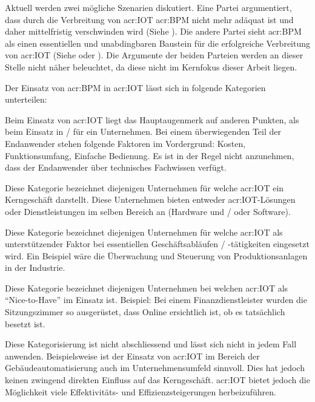 Aktuell werden zwei mögliche Szenarien diskutiert. Eine Partei argumentiert, dass durch die Verbreitung von \gls{acr:IOT} \gls{acr:BPM} nicht mehr adäquat ist und daher mittelfristig verschwinden wird (Siehe \cite{E:LinkedIn:Herring:IOTBPM}). Die andere Partei sieht \gls{acr:BPM} als einen essentiellen und unabdingbaren Baustein für die erfolgreiche Verbreitung von \gls{acr:IOT} (Siehe \cite{E:DataInformed:IOTBPM} oder \cite{E:InformationAge:IOTBPM}). Die Argumente der beiden Parteien werden an dieser Stelle nicht näher beleuchtet, da diese nicht im Kernfokus dieser Arbeit liegen.


Der Einsatz von \gls{acr:BPM} in \gls{acr:IOT} lässt sich in folgende Kategorien unterteilen:
\begin{itemize}
{Beim Einsatz von \gls{acr:IOT} liegt das Hauptaugenmerk auf anderen Punkten, als beim Einsatz in / für ein Unternehmen. Bei einem überwiegenden Teil der Endanwender stehen folgende Faktoren im Vordergrund: Kosten, Funktionsumfang, Einfache Bedienung. Es ist in der Regel nicht anzunehmen, dass der Endanwender über technisches Fachwissen verfügt.}

{Diese Kategorie bezeichnet diejenigen Unternehmen für welche \gls{acr:IOT} ein Kerngeschäft darstellt. Diese Unternehmen bieten entweder \gls{acr:IOT}-Lösungen oder Dienstleistungen im selben Bereich an (Hardware und / oder Software).}
 
{Diese Kategorie bezeichnet diejenigen Unternehmen für welche \gls{acr:IOT} als unterstützender Faktor bei essentiellen Geschäftsabläufen / -tätigkeiten eingesetzt wird. Ein Beispiel wäre die Überwachung und Steuerung von Produktionsanlagen in der Industrie.}

{Diese Kategorie bezeichnet diejenigen Unternehmen bei welchen \gls{acr:IOT} als "`Nice-to-Have"' im Einsatz ist. Beispiel: Bei einem Finanzdienstleister wurden die Sitzungszimmer so ausgerüstet, dass Online ersichtlich ist, ob es tatsächlich besetzt ist.}
\end{itemize} 

Diese Kategorisierung ist nicht abschliessend und lässt sich nicht in jedem Fall anwenden. Beispielsweise ist der Einsatz von \gls{acr:IOT} im Bereich der Gebäudeautomatisierung auch im Unternehmensumfeld sinnvoll. Dies hat jedoch keinen zwingend direkten Einfluss auf das Kerngeschäft. \gls{acr:IOT} bietet jedoch die Möglichkeit viele Effektivitäts- und Effizienzsteigerungen herbeizuführen.



